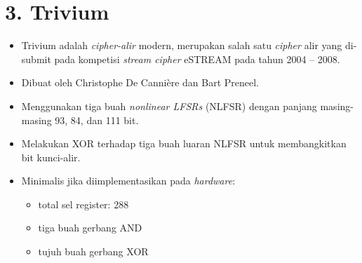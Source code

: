 \documentclass{article}
\begin{document}

\section*{3. Trivium}

\begin{itemize}
    \item Trivium adalah \textit{cipher-alir} modern, merupakan salah satu \textit{cipher} alir yang di-submit pada kompetisi \textit{stream cipher} eSTREAM pada tahun 2004 -- 2008.
    \item Dibuat oleh Christophe De Cannière dan Bart Preneel.
    \item Menggunakan tiga buah \textit{nonlinear LFSRs} (NLFSR) dengan panjang masing-masing 93, 84, dan 111 bit.
    \item Melakukan XOR terhadap tiga buah luaran NLFSR untuk membangkitkan bit kunci-alir.
    \item Minimalis jika diimplementasikan pada \textit{hardware}:
    \begin{itemize}
        \item total sel register: 288
        \item tiga buah gerbang AND
        \item tujuh buah gerbang XOR
    \end{itemize}
\end{itemize}
\end{document}
